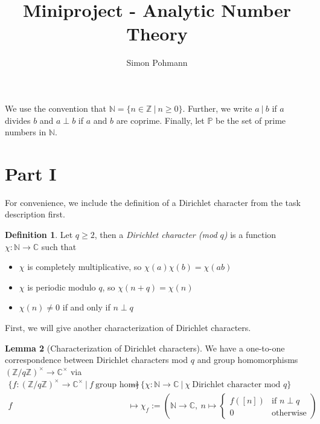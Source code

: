 \documentclass{scrartcl}
\title{Miniproject - Analytic Number Theory}
\author{Simon Pohmann}
\date{}
\newcommand{\primes}{\mathbb{P}}
\newcommand{\N}{\mathbb{N}}
\newcommand{\Z}{\mathbb{Z}}
\newcommand{\C}{\mathbb{C}}
\newcommand{\divides}{\ | \ }
\newcommand{\units}{\times}
\theoremstyle{definition}
\newtheorem{definition}{Definition}
\newtheorem{lemma}[definition]{Lemma}
\begin{document}
\maketitle
We use the convention that $\N = \{ n \in \Z \ | \ n \geq 0 \}$.
Further, we write $a \divides b$ if $a$ divides $b$ and $a \perp b$ if $a$ and $b$ are coprime.
Finally, let $\primes$ be the set of prime numbers in $\N$.

\section{Part I}

For convenience, we include the definition of a Dirichlet character from the task description first.
\begin{definition}
    Let $q \geq 2$, then a \emph{Dirichlet character (mod $q$)} is a function $\chi: \N \to \C$ such that
    \begin{itemize}
        \item $\chi$ is completely multiplicative, so $\chi(a)\chi(b) = \chi(ab)$
        \item $\chi$ is periodic modulo $q$, so $\chi(n + q) = \chi(n)$
        \item $\chi(n) \neq 0$ if and only if $n \perp q$
    \end{itemize}
\end{definition}
First, we will give another characterization of Dirichlet characters.
\begin{lemma}[Characterization of Dirichlet characters]
    \label{prop:characterization_dirichlet_character}
    We have a one-to-one correspondence between Dirichlet characters mod $q$ and group homomorphisms $(\Z/q\Z)^\units \to \C^\units$ via
    \begin{align*}
        \{ f: (\Z/q\Z)^\units \to \C^\units \ | \ f \ \text{group hom} \} &\to \{ \chi: \N \to \C \ | \ \chi \ \text{Dirichlet character mod $q$} \} \\
        f &\mapsto \chi_f := \left( \N \to \C, \ n \mapsto \begin{cases}
            f([n]) & \text{if $n \perp q$} \\
            0 & \text{otherwise}
        \end{cases} \right)
    \end{align*}
\end{lemma}
\end{document}
